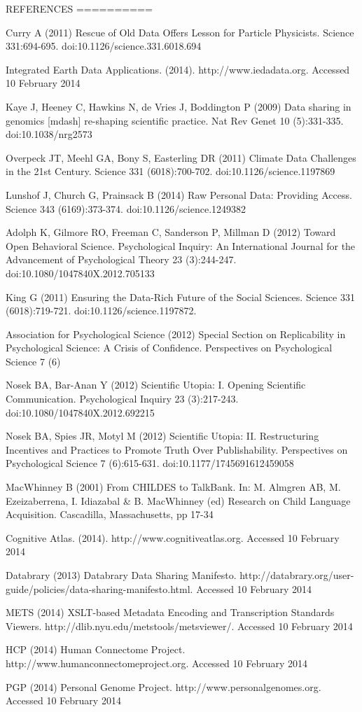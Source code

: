 \documentclass{sig-alternate}
\begin{document}
REFERENCES
==========

Curry A (2011) Rescue of Old Data Offers Lesson for Particle Physicists.
Science 331:694-695. doi:10.1126/science.331.6018.694

Integrated Earth Data Applications. (2014). http://www.iedadata.org.
Accessed 10 February 2014

Kaye J, Heeney C, Hawkins N, de Vries J, Boddington P (2009) Data
sharing in genomics [mdash] re-shaping scientific practice. Nat Rev
Genet 10 (5):331-335. doi:10.1038/nrg2573

Overpeck JT, Meehl GA, Bony S, Easterling DR (2011) Climate Data
Challenges in the 21st Century. Science 331 (6018):700-702.
doi:10.1126/science.1197869

Lunshof J, Church G, Prainsack B (2014) Raw Personal Data: Providing
Access. Science 343 (6169):373-374. doi:10.1126/science.1249382

Adolph K, Gilmore RO, Freeman C, Sanderson P, Millman D (2012) Toward
Open Behavioral Science. Psychological Inquiry: An International Journal
for the Advancement of Psychological Theory 23 (3):244-247.
doi:10.1080/1047840X.2012.705133

King G (2011) Ensuring the Data-Rich Future of the Social Sciences.
Science 331 (6018):719-721. doi:10.1126/science.1197872.

Association for Psychological Science (2012) Special Section on
Replicability in Psychological Science: A Crisis of Confidence.
Perspectives on Psychological Science 7 (6)

Nosek BA, Bar-Anan Y (2012) Scientific Utopia: I. Opening Scientific
Communication. Psychological Inquiry 23 (3):217-243.
doi:10.1080/1047840X.2012.692215

Nosek BA, Spies JR, Motyl M (2012) Scientific Utopia: II. Restructuring
Incentives and Practices to Promote Truth Over Publishability.
Perspectives on Psychological Science 7 (6):615-631.
doi:10.1177/1745691612459058

MacWhinney B (2001) From CHILDES to TalkBank. In: M. Almgren AB, M.
Ezeizaberrena, I. Idiazabal & B. MacWhinney (ed) Research on Child
Language Acquisition. Cascadilla, Massachusetts, pp 17-34

Cognitive Atlas. (2014). http://www.cognitiveatlas.org. Accessed 10
February 2014

Databrary (2013) Databrary Data Sharing Manifesto.
http://databrary.org/user-guide/policies/data-sharing-manifesto.html.
Accessed 10 February 2014

METS (2014) XSLT-based Metadata Encoding and Transcription Standards
Viewers. http://dlib.nyu.edu/metstools/metsviewer/. Accessed 10 February
2014

HCP (2014) Human Connectome Project.
http://www.humanconnectomeproject.org. Accessed 10 February 2014

PGP (2014) Personal Genome Project. http://www.personalgenomes.org.
Accessed 10 February 2014
\end{document}
